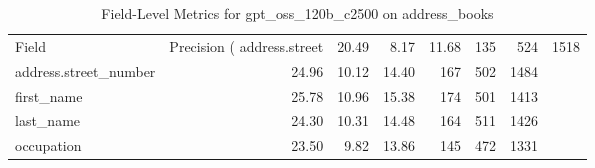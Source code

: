 \begin{table}
\caption{Field-Level Metrics for gpt_oss_120b_c2500 on address_books}
\label{tab:fields_gpt_oss_120b_c2500_address_books}
\begin{tabular}{lrrrrrr}
\toprule
Field & Precision (%
\midrule
address.street & 20.49 & 8.17 & 11.68 & 135 & 524 & 1518 \\
address.street_number & 24.96 & 10.12 & 14.40 & 167 & 502 & 1484 \\
first_name & 25.78 & 10.96 & 15.38 & 174 & 501 & 1413 \\
last_name & 24.30 & 10.31 & 14.48 & 164 & 511 & 1426 \\
occupation & 23.50 & 9.82 & 13.86 & 145 & 472 & 1331 \\
\bottomrule
\end{tabular}
\end{table}
